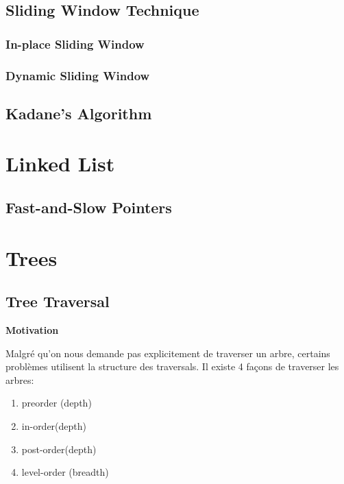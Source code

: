 \documentclass{article}
\begin{document}
\subsection{Sliding Window Technique}%
\label{sub:Sliding Window Technique}

\subsubsection{In-place Sliding Window}%
\label{ssub:In-place Sliding Window}

\subsubsection{Dynamic Sliding Window}%
\label{ssub:Dynamic Sliding Window}

\subsection{Kadane's Algorithm}%
\label{sub:Kadane's Algorithm}

\section{Linked List}%
\label{sec:Linked List}

\subsection{Fast-and-Slow Pointers}%
\label{sub:Fast-and-Slow Pointers}

\section{Trees}%
\label{sec:Trees}

\subsection{Tree Traversal}%
\label{sub:Tree Traversal}

\textbf{Motivation}

Malgré qu'on nous demande pas explicitement de traverser un arbre, certains
problèmes utilisent la structure des traversals. Il existe 4 façons de
traverser les arbres:
\begin{enumerate}
    \item preorder (depth)
    \item in-order(depth)
    \item post-order(depth)
    \item level-order (breadth)
\end{enumerate}
\end{document}

